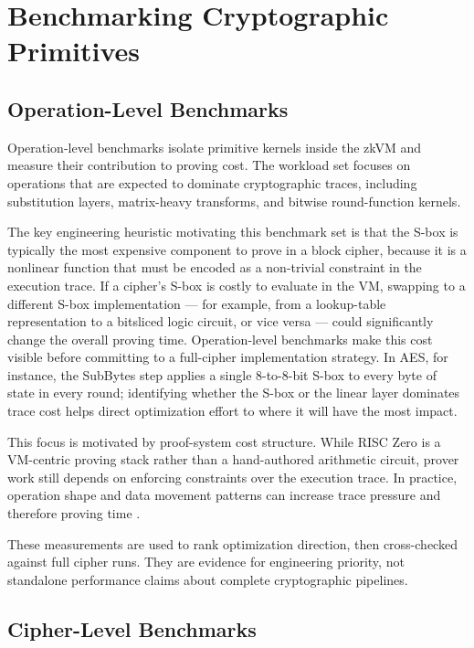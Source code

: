 \chapter{Benchmarking Cryptographic Primitives}

\section{Operation-Level Benchmarks}

Operation-level benchmarks isolate primitive kernels inside the zkVM and measure
their contribution to proving cost. The workload set focuses on operations that
are expected to dominate cryptographic traces, including substitution layers,
matrix-heavy transforms, and bitwise round-function kernels.

The key engineering heuristic motivating this benchmark set is that the S-box
is typically the most expensive component to prove in a block cipher, because it
is a nonlinear function that must be encoded as a non-trivial constraint in the
execution trace. If a cipher's S-box is costly to evaluate in the VM, swapping
to a different S-box implementation --- for example, from a lookup-table
representation to a bitsliced logic circuit, or vice versa --- could
significantly change the overall proving time. Operation-level benchmarks make
this cost visible before committing to a full-cipher implementation strategy. In
AES, for instance, the SubBytes step applies a single 8-to-8-bit S-box to every
byte of state in every round; identifying whether the S-box or the linear layer
dominates trace cost helps direct optimization effort to where it will have the
most impact.


This focus is motivated by proof-system cost structure. While RISC Zero is a
VM-centric proving stack rather than a hand-authored arithmetic circuit, prover
work still depends on enforcing constraints over the execution trace. In
practice, operation shape and data movement patterns can increase trace pressure
and therefore proving time \cite{bensasson2018stark,risczeroTraceDocs}.

These measurements are used to rank optimization direction, then cross-checked
against full cipher runs. They are evidence for engineering priority, not
standalone performance claims about complete cryptographic pipelines.

\section{Cipher-Level Benchmarks}

